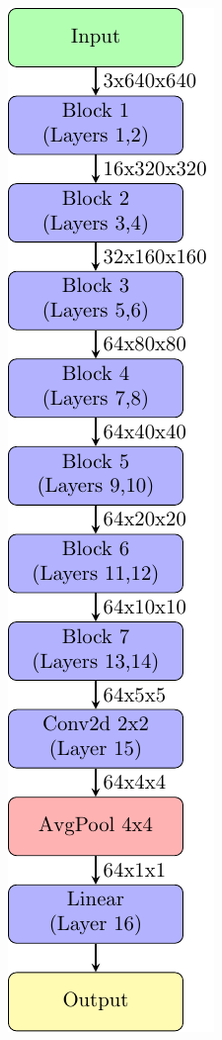 \documentclass[preprint]{elsarticle}
\theoremstyle{definition} %
\theoremstyle{remark}
\begin{document}
\begin{figure}[h!]
	\begin{subfigure}[b]{.30\textwidth}
		\centering
		\includegraphics[width=\textwidth]{figures/model640.pdf}

\end{subfigure}
\end{figure}
\end{document}
